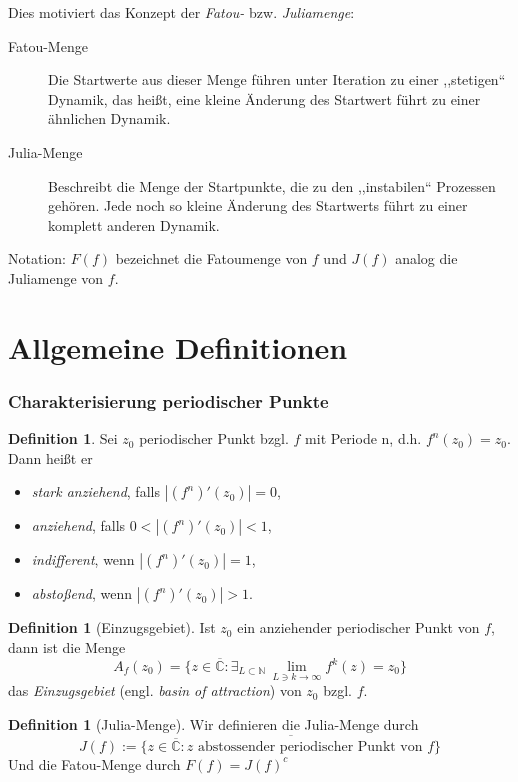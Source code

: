 \documentclass{beamer}
\newcommand{\N}{\mathbb{N}}
\theoremstyle{definition}
\newcounter{foo}
\newtheorem{df}[foo]{Definition}
\begin{document}
\begin{frame}
Dies motiviert das Konzept der \emph{Fatou-} bzw. \emph{Juliamenge}:
\begin{description}
\item[Fatou-Menge] Die Startwerte aus dieser Menge führen unter Iteration zu einer ,,stetigen`` Dynamik, das heißt, eine kleine Änderung des Startwert führt zu einer ähnlichen Dynamik.
\item[Julia-Menge] Beschreibt die Menge der Startpunkte, die zu den ,,instabilen`` Prozessen gehören. Jede noch so kleine Änderung des Startwerts führt zu einer komplett anderen Dynamik.
\end{description} 
Notation: $F(f)$ bezeichnet die Fatoumenge von $f$ und $J(f)$ analog die Juliamenge von $f$.
\end{frame}

\section{Allgemeine Definitionen}
\begin{frame}
\frametitle{Charakterisierung periodischer Punkte}
\begin{df} \label{1}
Sei $z_0$ periodischer Punkt bzgl. $f$ mit Periode n, d.h. $f^n(z_0)=z_0$. Dann heißt er
\begin{itemize}
\item \emph{stark anziehend}, falls $|(f^n)'(z_0)|=0$,
\item \emph{anziehend}, falls $0<|(f^n)'(z_0)|<1$,
\item \emph{indifferent}, wenn $|(f^n)'(z_0)|=1$,
\item \emph{abstoßend}, wenn $|(f^n)'(z_0)|>1$.
\end{itemize} 
\end{df}
\end{frame}

\begin{frame}
\begin{df}[Einzugsgebiet] \label{2}
Ist $z_0$ ein anziehender periodischer Punkt von $f$, dann ist die Menge
\[
	A_f(z_0)=\{z\in \overline{\mathbb{C}}: \exists_{L\subset \N} \, \lim\limits_{L\ni k\to \infty} f^{k}(z)=z_0\}
\]
das \emph{Einzugsgebiet} (engl. \emph{basin of attraction}) von $z_0$ bzgl. $f$.
\end{df}
\end{frame}

\begin{frame}
\begin{df}[Julia-Menge] \label{3}
Wir definieren die Julia-Menge durch
\[
J(f):=\overline{\{z\in \overline{\mathbb{C}}: z \text{ abstossender periodischer Punkt von $f$} \}}
\]
Und die Fatou-Menge durch $F(f)=J(f)^c$
\end{df}
\end{frame}
\end{document}
